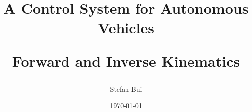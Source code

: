 \newcommand{\mytitle}{\textbf{A Control System for Autonomous Vehicles}\par
Forward and Inverse Kinematics}
\newcommand{\myauthor}{Stefan Bui}
\newcommand{\mysupervisor}{Sven Fjeldaas}

\title{\mytitle}
\author{\myauthor}
\date{\today}

\newcommand*{\captionsource}[1]{
    \fontsize{7}{6}\selectfont{
        \hspace{\linewidth}
        \textbf{Source:} #1
    }
}

\setlength\parindent{24pt}

\AtBeginDocument{%
  \setlength{\glsdescwidth}{0.8\columnwidth}%
  \setlength{\glspagelistwidth}{.1\columnwidth}%
}

{
    \renewcommand*{\glossaryheader}{}%
    \renewcommand{\glossentry}[2]{%
        \textbf{\glsentryitem{##1}\glstarget{##1}{\glossentryname{##1}}}
        & \glossentrydesc{##1}
        & ##2
        \tabularnewline}%
}